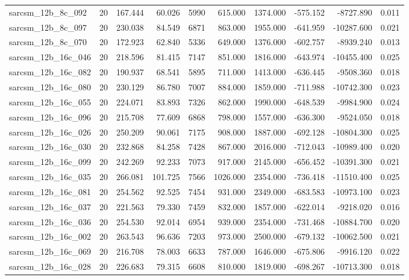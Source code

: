 \begin{tabular}{lrrrrrrrrr}
sarcsm\_12b\_8c\_092 & 20 & 167.444 & 60.026 & 5990 & 615.000 & 1374.000 & -575.152 & -8727.890 & 0.011 \\
sarcsm\_12b\_8c\_097 & 20 & 230.038 & 84.549 & 6871 & 863.000 & 1955.000 & -641.959 & -10287.600 & 0.021 \\
sarcsm\_12b\_8c\_070 & 20 & 172.923 & 62.840 & 5336 & 649.000 & 1376.000 & -602.757 & -8939.240 & 0.013 \\
sarcsm\_12b\_16c\_046 & 20 & 218.596 & 81.415 & 7147 & 851.000 & 1816.000 & -643.974 & -10455.400 & 0.025 \\
sarcsm\_12b\_16c\_082 & 20 & 190.937 & 68.541 & 5895 & 711.000 & 1413.000 & -636.445 & -9508.360 & 0.018 \\
sarcsm\_12b\_16c\_080 & 20 & 230.129 & 86.780 & 7007 & 884.000 & 1859.000 & -711.988 & -10742.300 & 0.023 \\
sarcsm\_12b\_16c\_055 & 20 & 224.071 & 83.893 & 7326 & 862.000 & 1990.000 & -648.539 & -9984.900 & 0.024 \\
sarcsm\_12b\_16c\_096 & 20 & 215.708 & 77.609 & 6868 & 798.000 & 1557.000 & -636.300 & -9524.050 & 0.018 \\
sarcsm\_12b\_16c\_026 & 20 & 250.209 & 90.061 & 7175 & 908.000 & 1887.000 & -692.128 & -10804.300 & 0.025 \\
sarcsm\_12b\_16c\_030 & 20 & 232.868 & 84.258 & 7428 & 867.000 & 2016.000 & -712.043 & -10989.400 & 0.020 \\
sarcsm\_12b\_16c\_099 & 20 & 242.269 & 92.233 & 7073 & 917.000 & 2145.000 & -656.452 & -10391.300 & 0.021 \\
sarcsm\_12b\_16c\_035 & 20 & 266.081 & 101.725 & 7566 & 1026.000 & 2354.000 & -736.418 & -11510.400 & 0.025 \\
sarcsm\_12b\_16c\_081 & 20 & 254.562 & 92.525 & 7454 & 931.000 & 2349.000 & -683.583 & -10973.100 & 0.023 \\
sarcsm\_12b\_16c\_037 & 20 & 221.563 & 79.330 & 7459 & 832.000 & 1857.000 & -622.014 & -9218.020 & 0.016 \\
sarcsm\_12b\_16c\_036 & 20 & 254.530 & 92.014 & 6954 & 939.000 & 2354.000 & -731.468 & -10884.700 & 0.020 \\
sarcsm\_12b\_16c\_002 & 20 & 263.543 & 96.636 & 7203 & 973.000 & 2500.000 & -679.132 & -10062.500 & 0.021 \\
sarcsm\_12b\_16c\_069 & 20 & 216.708 & 78.003 & 6633 & 787.000 & 1646.000 & -675.806 & -9916.120 & 0.022 \\
sarcsm\_12b\_16c\_028 & 20 & 226.683 & 79.315 & 6608 & 810.000 & 1819.000 & -698.267 & -10713.300 & 0.018 \\

\end{tabular}
